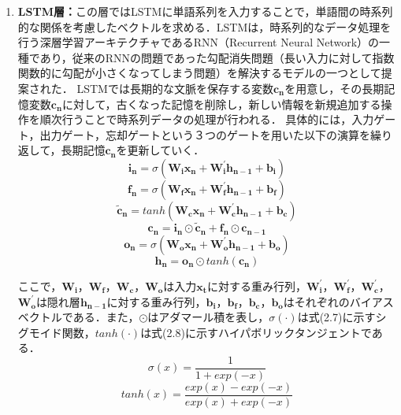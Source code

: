 \documentclass[a4paper,12pt,oneside,openany]{jsbook}
\begin{document}
\begin{enumerate}
\item {\bf LSTM層：}この層ではLSTMに単語系列を入力することで，単語間の時系列的な関係を考慮したベクトルを求める．LSTMは，時系列的なデータ処理を行う深層学習アーキテクチャであるRNN（Recurrent Neural Network）の一種であり，従来のRNNの問題であった勾配消失問題（長い入力に対して指数関数的に勾配が小さくなってしまう問題）を解決するモデルの一つとして提案された．
LSTMでは長期的な文脈を保存する変数$\mathbf{c_{n}}$を用意し，その長期記憶変数$\mathbf{c_{n}}$に対して，古くなった記憶を削除し，新しい情報を新規追加する操作を順次行うことで時系列データの処理が行われる．
具体的には，入力ゲート，出力ゲート，忘却ゲートという３つのゲートを用いた以下の演算を繰り返して，長期記憶$\mathbf{c_{n}}$を更新していく．
\begin{equation}
\mathbf{i_{n}}= \sigma(\mathbf{W_{i}}\mathbf{x_{n}}+\mathbf{W^{\prime}_{i}}\mathbf{h_{n-1}}+\mathbf{b_{i}})
\end{equation}
\begin{equation}
\mathbf{f_{n}}= \sigma(\mathbf{W_{f}}\mathbf{x_{n}}+\mathbf{W^{\prime}_{f}}\mathbf{h_{n-1}}+\mathbf{b_{f}})
\end{equation}
\begin{equation}
\mathbf{\tilde{c}_n}= tanh(\mathbf{W_{c}}\mathbf{x_{n}}+\mathbf{W^{\prime}_{c}}\mathbf{h_{n-1}}+\mathbf{b_{c}})
\end{equation}
\begin{equation}
\mathbf{c_{n}}= \mathbf{i_{n}}\odot \mathbf{\tilde{c}_n}+\mathbf{f_{n}}\odot \mathbf{c_{n-1}}
\end{equation}
\begin{equation}
\mathbf{o_{n}}= \sigma(\mathbf{W_{o}}\mathbf{x_{n}}+\mathbf{W^{\prime}_{o}}\mathbf{h_{n-1}}+\mathbf{b_{o}})
\end{equation}
\begin{equation}
\mathbf{h_{n}}= \mathbf{o_{n}}\odot tanh(\mathbf{c_{n}})
\end{equation}

ここで，$\mathbf{W_{i}}$，$\mathbf{W_{f}}$，$\mathbf{W_{c}}$，$\mathbf{W_{o}}$は入力$\mathbf{x_{t}}$に対する重み行列，$\mathbf{W^{\prime}_{i}}$，$\mathbf{W^{\prime}_{f}}$，$\mathbf{W^{\prime}_{c}}$，$\mathbf{W^{\prime}_{o}}$は隠れ層$\mathbf{h_{n-1}}$に対する重み行列，$\mathbf{b_{i}}$，$\mathbf{b_{f}}$，$\mathbf{b_{c}}$，$\mathbf{b_{o}}$はそれぞれのバイアスベクトルである．また，$\odot$はアダマール積を表し，$\sigma(\cdot)$は式(2.7)に示すシグモイド関数，$tanh(\cdot)$は式(2.8)に示すハイパボリックタンジェントである．
\begin{equation}
\sigma(x)=\frac{1}{1+exp(-x)}
\end{equation}
\begin{equation}
tanh(x)=\frac{exp(x)-exp(-x)}{exp(x)+exp(-x)}
\end{equation}


\end{enumerate}
\end{document}
